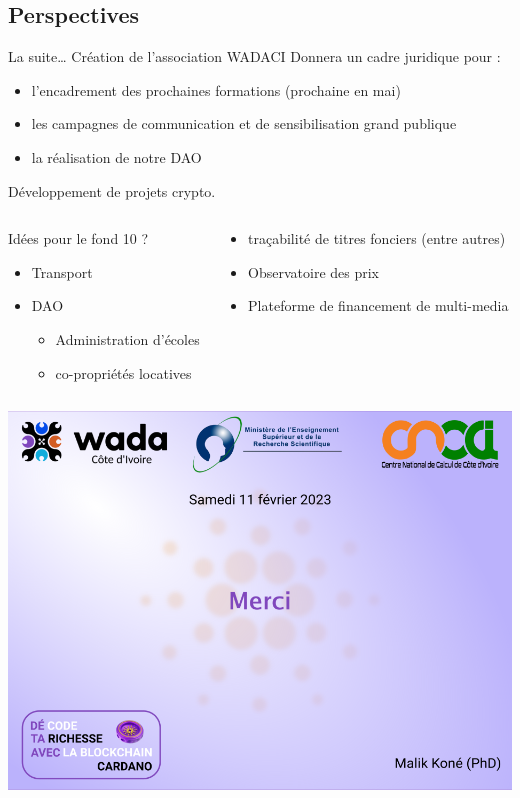 \documentclass[presentation]{beamer}
\begin{document}
\subsection{Perspectives}
\label{sec:orge566750}
\begin{frame}[label={sec:org20a9eee}]{La suite\ldots{}  Création de l'association WADACI}
Donnera un cadre juridique pour :
\begin{itemize}
\item l'encadrement des prochaines formations (prochaine en mai)
\item les campagnes de communication et de sensibilisation grand publique
\item la réalisation de notre DAO
\end{itemize}
\begin{block}{Développement de projets crypto.}
\begin{columns}
\begin{column}{0.5\columnwidth}
\begin{block}{Idées pour le fond 10 ?}
\begin{itemize}
\item Transport
\item DAO 
\begin{itemize}
\item Administration d'écoles
\item co-propriétés locatives
\end{itemize}
\end{itemize}
\end{block}
\end{column}
\begin{column}{0.5\columnwidth}
\begin{block}{}
\begin{itemize}
\item traçabilité de titres fonciers (entre autres)
\item Observatoire des prix
\item Plateforme de financement de multi-media
\end{itemize}
\end{block}
\end{column}
\end{columns}
\end{block}
\end{frame}
\begin{frame}[label={sec:orgf0c5734}]{}
\begin{center}
\includegraphics[height=\textheight]{Images/merci_wadaci.png}
\end{center}
\end{frame}
\end{document}
